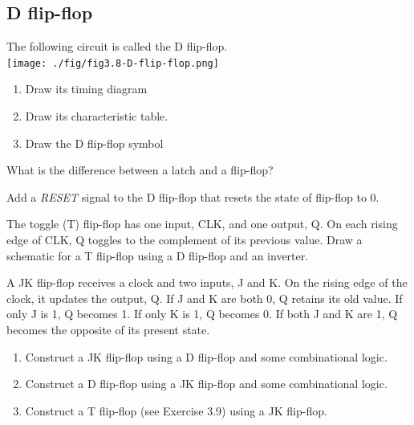 \subsection{D flip-flop \cite[Sec~3.2.2]{harris2022digital}}

\begin{definition}
  The following circuit is called the D flip-flop. \\
  \texttt{[image: ./fig/fig3.8-D-flip-flop.png]} \\
  \begin{enumerate}
  \item Draw its timing  diagram
  \item Draw its characteristic table.
  \item Draw the D flip-flop symbol
  \end{enumerate}
\end{definition}
\vspace{20em}

\begin{remark}
  What is the difference between a latch and a flip-flop?
\end{remark}
\vspace{5em}

\begin{example}
  Add a \emph{RESET} signal to the D flip-flop that resets the state of flip-flop to 0.
\end{example}
\vspace{20em}

\begin{example}
  The toggle (T) flip-flop has one input, CLK, and one output, Q. On
  each rising edge of CLK, Q toggles to the complement of its previous value. Draw
  a schematic for a T flip-flop using a D flip-flop and an inverter.
\end{example}
\vspace{20em}

\begin{prob}
  A JK flip-flop receives a clock and two inputs, J and K. On the rising
  edge of the clock, it updates the output, Q. If J and K are both 0, Q retains its old
  value. If only J is 1, Q becomes 1. If only K is 1, Q becomes 0. If both J and K are 1,
  Q becomes the opposite of its present state.
  \begin{enumerate}
  \item Construct a JK flip-flop using a D flip-flop and some combinational logic.
  \item Construct a D flip-flop using a JK flip-flop and some combinational logic.
  \item Construct a T flip-flop (see Exercise 3.9) using a JK flip-flop.
  \end{enumerate}
\end{prob}


